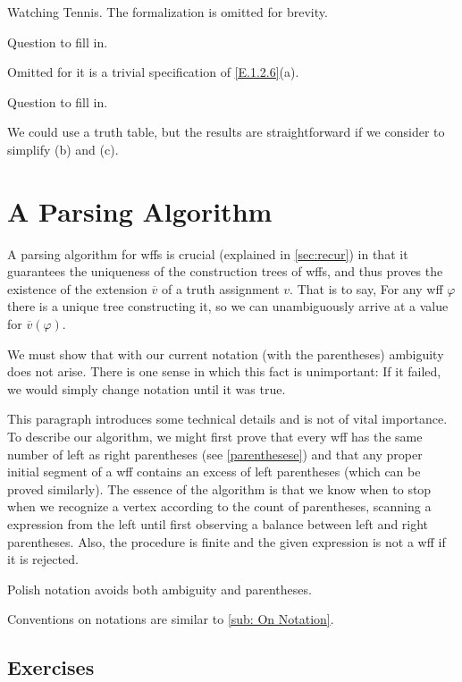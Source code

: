 Watching Tennis. The formalization is omitted for brevity.

\begin{exercise}
  Question to fill in.
\end{exercise}

Omitted for it is a trivial specification of \ref{E.1.2.6}(a).

\begin{exercise}
  Question to fill in.
\end{exercise}

We could use a truth table, but the results are straightforward if we consider to simplify (b) and (c).

\section{A Parsing Algorithm}\label{sec:1.3}

A parsing algorithm for wffs is crucial (explained in \ref{sec:recur}) in that it guarantees the uniqueness of the construction trees of wffs, and thus proves the existence of the extension $\overline{v}$ of a truth assignment $v$. That is to say, For any wff $\varphi$ there is a unique tree constructing it, so we can unambiguously arrive at a value for $\overline{v}(\varphi)$.

We must show that with our current notation (with the parentheses) ambiguity does not arise. There is one sense in which this fact is unimportant: If it failed, we would simply change notation until it was true.

This paragraph introduces some technical details and is not of vital importance. To describe our algorithm, we might first prove that every wff has the same number of left as right parentheses (see \ref{parenthesese}) and that any proper initial segment of a wff contains an excess of left parentheses (which can be proved similarly). The essence of the algorithm is that we know when to stop when we recognize a vertex according to the count of parentheses, scanning a expression from the left until first observing a balance between left and right parentheses. Also, the procedure is finite and the given expression is not a wff if it is rejected.

Polish notation avoids both ambiguity and parentheses.

Conventions on notations are similar to \ref{sub: On Notation}.

\subsection*{Exercises}

